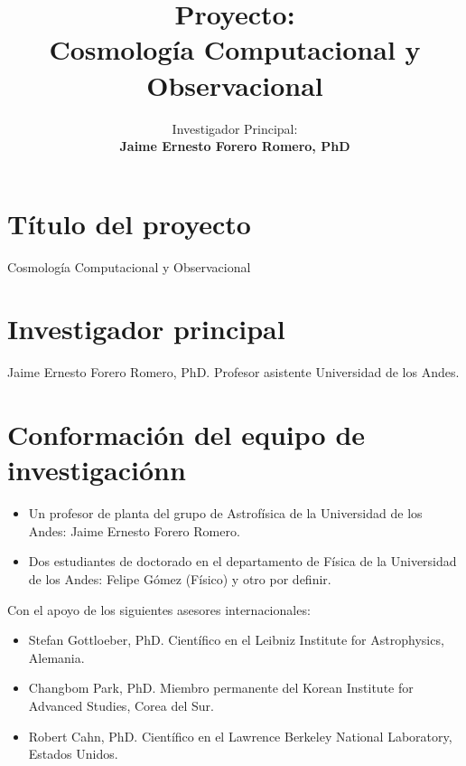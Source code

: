 \documentclass[12pt]{article}
\title{Proyecto:\\{\bf Cosmolog\'ia Computacional y Observacional}}
\author{Investigador Principal:\\{\bf Jaime Ernesto Forero Romero,
    PhD}\\
}
\begin{document}
\maketitle
\tableofcontents 
\newpage

\section{T\'itulo del proyecto}
\noindent
Cosmolog\'ia Computacional y Observacional

\section{Investigador principal}

\noindent
Jaime Ernesto Forero Romero, PhD. Profesor asistente Universidad de los Andes. 


\section{Conformaci\'on del equipo de investigaci\'onn}

\begin{itemize}
\item Un profesor de planta del grupo de Astrof\'isica de la
  Universidad de los Andes: Jaime Ernesto  Forero Romero.  
\item Dos estudiantes de doctorado en el departamento de F\'isica de
  la Universidad de los Andes: Felipe G\'omez (F\'isico) y otro por
  definir.  
\end{itemize}

\noindent
Con el apoyo de los siguientes asesores internacionales:

\begin{itemize}

\item Stefan Gottloeber, PhD. Cient\'ifico en el Leibniz Institute for Astrophysics, Alemania.
\item Changbom Park, PhD. Miembro permanente del Korean Institute for Advanced Studies, Corea del Sur.
\item Robert Cahn, PhD. Cient\'ifico en el Lawrence Berkeley National Laboratory, Estados   Unidos.
\end{itemize}
\end{document}
